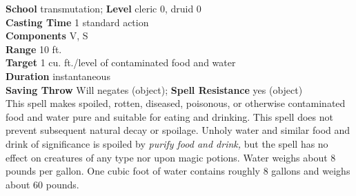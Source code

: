 \textbf{School} transmutation; \textbf{Level} cleric 0, druid 0\\
\textbf{Casting Time} 1 standard action\\
\textbf{Components} V, S\\
\textbf{Range} 10 ft.\\
\textbf{Target} 1 cu. ft./level of contaminated food and water\\
\textbf{Duration} instantaneous\\
\textbf{Saving Throw }Will negates (object); \textbf{Spell Resistance} yes (object)\\
This spell makes spoiled, rotten, diseased, poisonous, or otherwise contaminated food and water pure and suitable for eating and drinking. This spell does not prevent subsequent natural decay or spoilage. Unholy water and similar food and drink of significance is spoiled by \textit{purify food and drink, }but the spell has no effect on creatures of any type nor upon magic potions. Water weighs about 8 pounds per gallon. One cubic foot of water contains roughly 8 gallons and weighs about 60 pounds.\\
